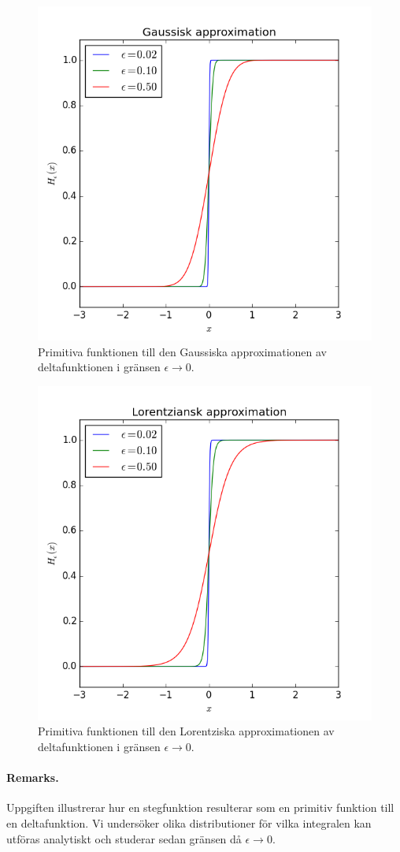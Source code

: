 \documentclass[%
oneside,                 %
final,                   %
10pt]{article}
\newenvironment{doconceexercise}{}{}
\begin{document}
\begin{doconceexercise}
\begin{figure}[!ht]  %
  \centerline{\includegraphics[width=0.6\linewidth]{fig/fig711.png}}
  \caption{
  Primitiva funktionen till den Gaussiska approximationen av deltafunktionen i gränsen $\epsilon \to 0$. \label{fig:711}
  }
\end{figure}



\begin{figure}[!ht]  %
  \centerline{\includegraphics[width=0.6\linewidth]{fig/fig712.png}}
  \caption{
  Primitiva funktionen till den Lorentziska approximationen av deltafunktionen i gränsen $\epsilon \to 0$. \label{fig:712}
  }
\end{figure}




\paragraph{Remarks.}
Uppgiften illustrerar hur en stegfunktion resulterar som en primitiv funktion till en deltafunktion. Vi undersöker olika distributioner för vilka integralen kan utföras analytiskt och studerar sedan gränsen då $\epsilon \to 0$.


\end{doconceexercise}



\end{document}
